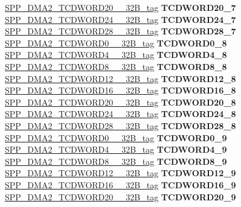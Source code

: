 \begin{DoxyCompactItemize}
\begin{tabbing}
\>\>\mbox{\hyperlink{unionSPP__DMA2__TCDWORD20____32B__tag}{SPP\_DMA2\_TCDWORD20\_\_32B\_tag}} {\bfseries TCDWORD20\_7}\\
\>\>\mbox{\hyperlink{unionSPP__DMA2__TCDWORD24____32B__tag}{SPP\_DMA2\_TCDWORD24\_\_32B\_tag}} {\bfseries TCDWORD24\_7}\\
\>\>\mbox{\hyperlink{unionSPP__DMA2__TCDWORD28____32B__tag}{SPP\_DMA2\_TCDWORD28\_\_32B\_tag}} {\bfseries TCDWORD28\_7}\\
\>\>\mbox{\hyperlink{unionSPP__DMA2__TCDWORD0____32B__tag}{SPP\_DMA2\_TCDWORD0\_\_32B\_tag}} {\bfseries TCDWORD0\_8}\\
\>\>\mbox{\hyperlink{unionSPP__DMA2__TCDWORD4____32B__tag}{SPP\_DMA2\_TCDWORD4\_\_32B\_tag}} {\bfseries TCDWORD4\_8}\\
\>\>\mbox{\hyperlink{unionSPP__DMA2__TCDWORD8____32B__tag}{SPP\_DMA2\_TCDWORD8\_\_32B\_tag}} {\bfseries TCDWORD8\_8}\\
\>\>\mbox{\hyperlink{unionSPP__DMA2__TCDWORD12____32B__tag}{SPP\_DMA2\_TCDWORD12\_\_32B\_tag}} {\bfseries TCDWORD12\_8}\\
\>\>\mbox{\hyperlink{unionSPP__DMA2__TCDWORD16____32B__tag}{SPP\_DMA2\_TCDWORD16\_\_32B\_tag}} {\bfseries TCDWORD16\_8}\\
\>\>\mbox{\hyperlink{unionSPP__DMA2__TCDWORD20____32B__tag}{SPP\_DMA2\_TCDWORD20\_\_32B\_tag}} {\bfseries TCDWORD20\_8}\\
\>\>\mbox{\hyperlink{unionSPP__DMA2__TCDWORD24____32B__tag}{SPP\_DMA2\_TCDWORD24\_\_32B\_tag}} {\bfseries TCDWORD24\_8}\\
\>\>\mbox{\hyperlink{unionSPP__DMA2__TCDWORD28____32B__tag}{SPP\_DMA2\_TCDWORD28\_\_32B\_tag}} {\bfseries TCDWORD28\_8}\\
\>\>\mbox{\hyperlink{unionSPP__DMA2__TCDWORD0____32B__tag}{SPP\_DMA2\_TCDWORD0\_\_32B\_tag}} {\bfseries TCDWORD0\_9}\\
\>\>\mbox{\hyperlink{unionSPP__DMA2__TCDWORD4____32B__tag}{SPP\_DMA2\_TCDWORD4\_\_32B\_tag}} {\bfseries TCDWORD4\_9}\\
\>\>\mbox{\hyperlink{unionSPP__DMA2__TCDWORD8____32B__tag}{SPP\_DMA2\_TCDWORD8\_\_32B\_tag}} {\bfseries TCDWORD8\_9}\\
\>\>\mbox{\hyperlink{unionSPP__DMA2__TCDWORD12____32B__tag}{SPP\_DMA2\_TCDWORD12\_\_32B\_tag}} {\bfseries TCDWORD12\_9}\\
\>\>\mbox{\hyperlink{unionSPP__DMA2__TCDWORD16____32B__tag}{SPP\_DMA2\_TCDWORD16\_\_32B\_tag}} {\bfseries TCDWORD16\_9}\\
\>\>\mbox{\hyperlink{unionSPP__DMA2__TCDWORD20____32B__tag}{SPP\_DMA2\_TCDWORD20\_\_32B\_tag}} {\bfseries TCDWORD20\_9}\\

\end{tabbing}
\end{DoxyCompactItemize}
